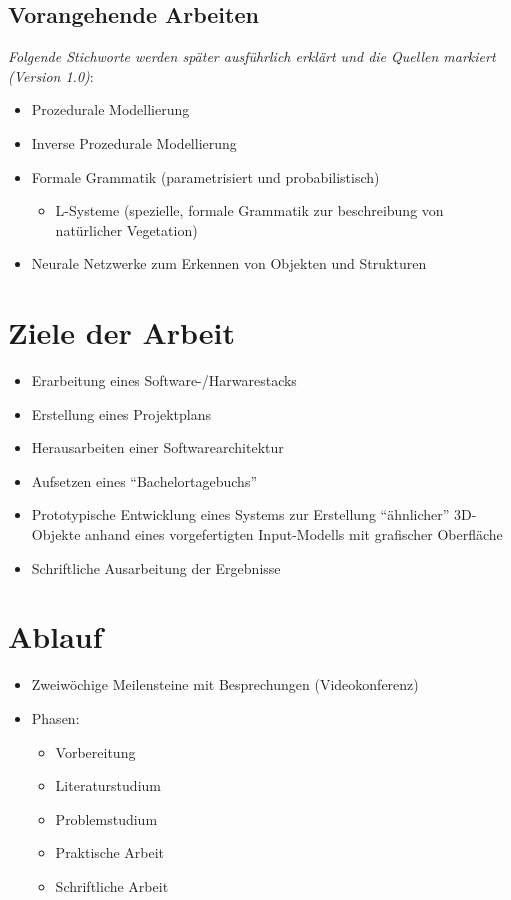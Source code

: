 \documentclass[11pt]{article}
\begin{document}
    \newpage

    \subsection{Vorangehende Arbeiten}
    \textit{Folgende Stichworte werden später ausführlich erklärt und die Quellen markiert (Version 1.0)}:
    \begin{itemize}
        \item Prozedurale Modellierung
        \item Inverse Prozedurale Modellierung
        \item Formale Grammatik (parametrisiert und probabilistisch)
        \begin{itemize}
            \item L-Systeme (spezielle, formale Grammatik zur beschreibung von natürlicher Vegetation)
        \end{itemize}
        \item Neurale Netzwerke zum Erkennen von Objekten und Strukturen
    \end{itemize}

    \newpage

    \section{Ziele der Arbeit}
    \begin{itemize}
        \item Erarbeitung eines Software-/Harwarestacks
        \item Erstellung eines Projektplans
        \item Herausarbeiten einer Softwarearchitektur
        \item Aufsetzen eines "`Bachelortagebuchs"'
        \item Prototypische Entwicklung eines Systems zur Erstellung "`ähnlicher"' 3D-Objekte anhand eines
        vorgefertigten Input-Modells mit grafischer Oberfläche
        \item Schriftliche Ausarbeitung der Ergebnisse
    \end{itemize}

    \section{Ablauf}
    \begin{itemize}
        \item Zweiwöchige Meilensteine mit Besprechungen (Videokonferenz)
        \item Phasen:
        \begin{itemize}
            \item Vorbereitung
            \item Literaturstudium
            \item Problemstudium
            \item Praktische Arbeit
            \item Schriftliche Arbeit
        \end{itemize}
    \end{itemize}
\end{document}
